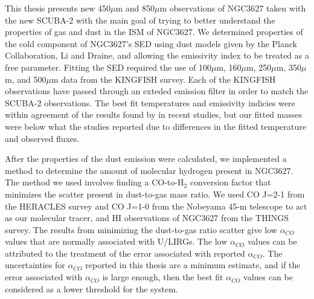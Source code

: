 This thesis presents new 450$\mu$m and 850$\mu$m observations of NGC3627 taken with the new SCUBA-2 with the main goal of trying to better understand the properties of gas and dust in the ISM of NGC3627.  We determined properties of the cold component of NGC3627's SED using dust models given by the Planck Collaboration, Li and Draine, and allowing the emissivity index to be treated as a free parameter.  Fitting the SED required the use of 100$\mu$m, 160$\mu$m, 250$\mu$m, 350$\mu$m, and 500$\mu$m data from the KINGFISH survey.  Each of the KINGFISH observations have passed through an exteded emission filter in order to match the SCUBA-2 observations.  The best fit temperatures and emissivity indicies were within agreement of the results found by in recent studies, but our fitted masses were below what the studies reported due to differences in the fitted temperature and observed fluxes.

After the properties of the dust emission were calculated, we implemented a method to determine the amount of molecular hydrogen present in NGC3627.  The method we used involves finding a CO-to-H$_2$ conversion factor that minimizes the scatter present in dust-to-gas mass ratio. We used CO J=2-1 from the HERACLES survey and CO J=1-0 from the Nobeyama 45-m telescope to act as our molecular tracer, and HI observations of NGC3627 from the THINGS survey.  The results from minimizing the dust-to-gas ratio scatter give low $\alpha_{CO}$ values that are normally associated with U/LIRGs.  The low $\alpha_{CO}$ values can be attributed to the treatment of the error associated with reported $\alpha_{CO}$.  The uncertainties for $\alpha_{CO}$ reported in this thesis are a minimum estimate, and if the error associated with $\alpha_{CO}$ is large enough, then the best fit $\alpha_{CO}$ values can be considered as a lower threshold for the system.
